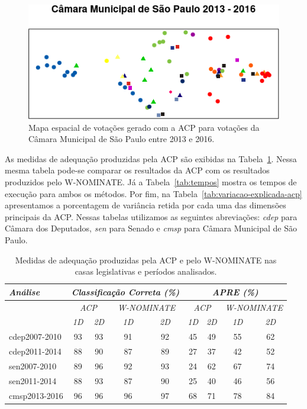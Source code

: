 \documentclass[a4paper, 12pt]{article}
\newcommand\wnominate{W-NOMINATE\xspace}
\begin{document}
\begin{figure}[h!]
  \centering
  \includegraphics[scale=0.9]{figs/cmsp2013-2016.png}
  \caption{Mapa espacial de votações gerado com a ACP para votações da Câmara Municipal de São Paulo entre 2013 e 2016.}
  \label{fig:cmsp2013-2016}
\end{figure}

As medidas de adequação produzidas pela ACP são exibidas na Tabela~\ref{tab:fit}. Nessa mesma tabela pode-se comparar os resultados da ACP com os resultados produzidos pelo \wnominate. Já a Tabela~\ref{tab:tempos} mostra os tempos de execução para ambos os métodos. Por fim, na Tabela~\ref{tab:variacao-explicada-acp} apresentamos a porcentagem de variância retida por cada uma das dimensões principais da ACP. Nessas tabelas utilizamos as seguintes abreviações: \emph{cdep} para Câmara dos Deputados, \emph{sen} para Senado e \emph{cmsp} para Câmara Municipal de São Paulo.

\begin{table}
\centering
\begin{tabular}{l | c c | c c | c c | c c} 
\itshape Análise & \multicolumn{4}{c|}{\itshape Classificação Correta (\%)} & \multicolumn{4}{|c}{\itshape APRE (\%)} \\ 
\hline 
& \multicolumn{2}{c|}{\itshape ACP} & \multicolumn{2}{|c|}{\itshape \wnominate} & \multicolumn{2}{|c|}{\itshape ACP} & \multicolumn{2}{c}{\itshape \wnominate} \\ 
\hline 
& \itshape 1D & \itshape 2D & \itshape 1D & \itshape 2D & \itshape 1D & \itshape 2D & \itshape 1D & \itshape 2D \\ 
\hline 
cdep2007-2010 & 93 & 93 & 91 & 92 & 45 & 49 & 55 & 62 \\ 
cdep2011-2014 & 88 & 90 & 87 & 89 & 27 & 37 & 42 & 52 \\ 
sen2007-2010  & 89 & 96 & 92 & 93 & 24 & 62 & 67 & 74 \\ 
sen2011-2014  & 88 & 93 & 87 & 90 & 25 & 40 & 46 & 56 \\ 
cmsp2013-2016 & 96 & 96 & 96 & 97 & 68 & 71 & 78 & 84 \\ 
\end{tabular} 
\caption{Medidas de adequação produzidas pela ACP e pelo \wnominate nas casas legislativas e períodos analisados.}
\label{tab:fit}
\end{table}
\end{document}
